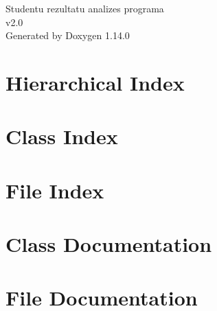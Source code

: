 \documentclass[twoside]{book}
\newcommand{\+}{\discretionary{\mbox{\scriptsize$\hookleftarrow$}}{}{}}
\newcommand{\clearemptydoublepage}{%
    \newpage{\pagestyle{empty}\cleardoublepage}%
  }
\begin{document}
  \raggedbottom
    \hypersetup{pageanchor=false,
                bookmarksnumbered=true,
                pdfencoding=unicode
               }
  \begin{titlepage}
  \vspace*{7cm}
  \begin{center}%
  {\Large Studentu rezultatu analizes programa}\\
  [1ex]\large v2.\+0 \\
  \vspace*{1cm}
  {\large Generated by Doxygen 1.14.0}\\
  \end{center}
  \end{titlepage}
  \clearemptydoublepage
  \tableofcontents
  \clearemptydoublepage
  \hypersetup{pageanchor=true}

\chapter{Hierarchical Index}

\chapter{Class Index}

\chapter{File Index}

\chapter{Class Documentation}



\chapter{File Documentation}























  \backmatter
  \newpage
  \clearemptydoublepage
  \printindex
\end{document}
